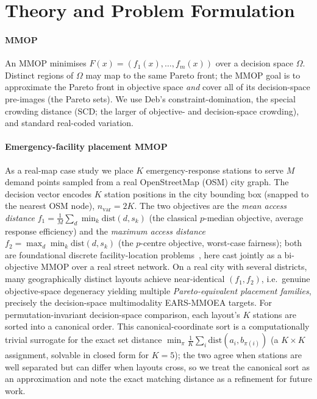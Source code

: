 \section{Theory and Problem Formulation}
\label{sec:formulation}

\paragraph{MMOP} An MMOP minimises $F(x)=(f_1(x),\dots,f_m(x))$ over a decision space
$\Omega$. Distinct regions of $\Omega$ may map to the same Pareto front; the MMOP goal is
to approximate the Pareto front in objective space \emph{and} cover all of its
decision-space pre-images (the Pareto sets). We use Deb's constraint-domination, the
special crowding distance (SCD; the larger of objective- and decision-space crowding),
and standard real-coded variation.

\paragraph{Emergency-facility placement MMOP} As a real-map case study we place $K$
emergency-response stations to serve $M$ demand points sampled from a real OpenStreetMap (OSM)
city graph.
The decision vector encodes $K$ station positions in the city bounding box (snapped to
the nearest OSM node), $n_{\mathrm{var}}=2K$. The two objectives are the \emph{mean access
distance} $f_1=\tfrac{1}{M}\sum_d \min_k \mathrm{dist}(d,s_k)$ (the classical $p$-median
objective, average response efficiency) and the \emph{maximum access distance}
$f_2=\max_d \min_k \mathrm{dist}(d,s_k)$ (the $p$-centre objective, worst-case fairness);
both are foundational discrete facility-location
problems~\parencite{daskin2013facility,revelle2008location}, here cast jointly as a bi-objective
MMOP over a real street network. On a real city with several
districts, many geographically distinct layouts achieve near-identical $(f_1,f_2)$, i.e.\
genuine objective-space degeneracy yielding multiple \emph{Pareto-equivalent placement
families}, precisely the decision-space multimodality EARS-MMOEA targets. For
permutation-invariant decision-space comparison, each layout's $K$ stations are sorted
into a canonical order. This canonical-coordinate sort is a computationally trivial surrogate
for the exact set distance $\min_{\pi}\frac1K\sum_i \mathrm{dist}(a_i,b_{\pi(i)})$ (a $K\times K$
assignment, solvable in closed form for $K{=}5$); the two agree when stations are well separated
but can differ when layouts cross, so we treat the canonical sort as an approximation and note
the exact matching distance as a refinement for future work.
